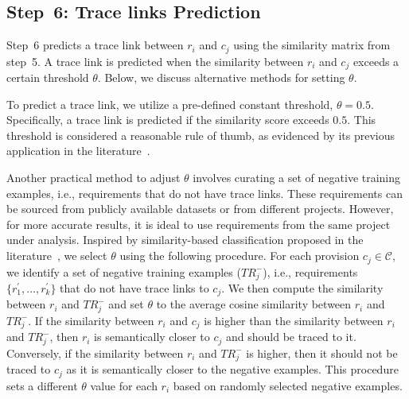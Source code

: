 \subsection*{Step~6: Trace links Prediction }  
Step~6 predicts a trace link between $r_i$ and $c_j$ using the similarity matrix from step~5. A trace link is predicted when the similarity between $r_i$ and $c_j$ exceeds a certain threshold $\theta$. 
Below, we discuss alternative methods for setting $\theta$.

To predict a trace link, we utilize a pre-defined constant threshold, $\theta = 0.5$. Specifically, a trace link is predicted if the similarity score exceeds $0.5$. 
This threshold is considered a reasonable rule of thumb, as evidenced by its previous application in the literature~\cite{Yao2014,Corley2005}. 

%
Another practical method to adjust $\theta$ involves curating a set of negative training examples, i.e., requirements that do not have trace links. These requirements can be sourced from publicly available datasets or from different projects. However, for more accurate results, it is ideal to use requirements from the same project under analysis.  
%
Inspired by similarity-based classification proposed in the literature~\cite{Amaral:21}, we select $\theta$ using the following procedure. 
For each provision $c_j \in \mathcal{C}$, we identify a set of negative training examples ($TR_j^-$), i.e., requirements $\{r_1^\prime, \ldots, r_k^\prime\}$ that do not have trace links to $c_j$. We then compute the similarity between $r_i$ and $TR_j^-$ and set $\theta$ to the average cosine similarity between $r_i$ and $TR_j^-$. 
If the similarity between $r_i$ and $c_j$ is higher than the similarity between $r_i$ and $TR_j^-$, then $r_i$ is semantically closer to $c_j$ and should be traced to it.  
Conversely, if the similarity between $r_i$ and $TR_j^-$ is higher, then it should not be traced to $c_j$ as it is semantically  closer to the negative examples.   
This procedure sets a different $\theta$ value for each $r_i$ based on randomly selected negative examples. 

